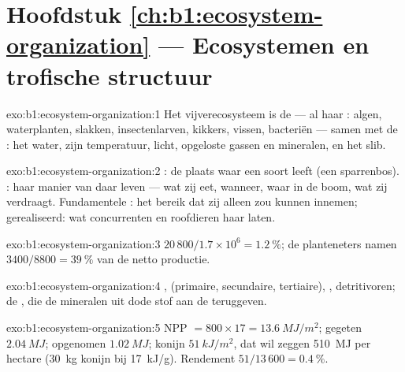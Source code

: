\section*{Hoofdstuk \ref{ch:b1:ecosystem-organization} --- Ecosystemen en trofische structuur}

\begin{solution}{exo:b1:ecosystem-organization:1}
Het vijverecosysteem is de  --- al haar : algen,
waterplanten, slakken, insectenlarven, kikkers, vissen, bacteriën ---
samen met de : het water, zijn temperatuur, licht, opgeloste gassen
en mineralen, en het slib.
\end{solution}

\begin{solution}{exo:b1:ecosystem-organization:2}
: de plaats waar een soort leeft (een sparrenbos). : haar
manier van daar leven --- wat zij eet, wanneer, waar in de boom, wat zij
verdraagt. Fundamentele : het bereik dat zij alleen zou kunnen innemen;
gerealiseerd: wat concurrenten en roofdieren haar laten.
\end{solution}

\begin{solution}{exo:b1:ecosystem-organization:3}
$20\,800/1.7\times 10^6 = \qty{1.2}{\%}$; de planteneters namen
$3400/8800 = \qty{39}{\%}$ van de netto productie.
\end{solution}

\begin{solution}{exo:b1:ecosystem-organization:4}
,  (primaire, secundaire, tertiaire), ,
detritivoren; de , die de mineralen uit dode stof aan de
 teruggeven.
\end{solution}

\begin{solution}{exo:b1:ecosystem-organization:5}
NPP $= 800\times 17 = \qty{13.6}{MJ/m^2}$; gegeten $\qty{2.04}{MJ}$;
opgenomen $\qty{1.02}{MJ}$; konijn $\qty{51}{kJ/m^2}$, dat wil zeggen
\qty{510}{MJ} per hectare (\qty{30}{kg} konijn bij \qty{17}{kJ/g}).
Rendement $51/13\,600 = \qty{0.4}{\%}$.
\end{solution}

